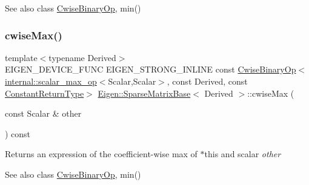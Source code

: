 \begin{DoxySeeAlso}{See also}
class \mbox{\hyperlink{class_eigen_1_1_cwise_binary_op}{Cwise\+Binary\+Op}}, min() 
\end{DoxySeeAlso}
\mbox{\label{class_eigen_1_1_sparse_matrix_base_aa9a80f82024c49bf896a8e9422d96a3b}} 
\subsubsection{\texorpdfstring{cwiseMax()}{cwiseMax()}\hspace{0.1cm}{\footnotesize\ttfamily [2/2]}}
{\footnotesize\ttfamily template$<$typename Derived$>$ \\
E\+I\+G\+E\+N\+\_\+\+D\+E\+V\+I\+C\+E\+\_\+\+F\+U\+NC E\+I\+G\+E\+N\+\_\+\+S\+T\+R\+O\+N\+G\+\_\+\+I\+N\+L\+I\+NE const \mbox{\hyperlink{class_eigen_1_1_cwise_binary_op}{Cwise\+Binary\+Op}}$<$\mbox{\hyperlink{struct_eigen_1_1internal_1_1scalar__max__op}{internal\+::scalar\+\_\+max\+\_\+op}}$<$Scalar,Scalar$>$, const Derived, const \mbox{\hyperlink{class_eigen_1_1_cwise_nullary_op}{Constant\+Return\+Type}}$>$ \mbox{\hyperlink{class_eigen_1_1_sparse_matrix_base}{Eigen\+::\+Sparse\+Matrix\+Base}}$<$ Derived $>$\+::cwise\+Max (\begin{DoxyParamCaption}\item[{const Scalar \&}]{other }\end{DoxyParamCaption}) const\hspace{0.3cm}{\ttfamily [inline]}}

\begin{DoxyReturn}{Returns}
an expression of the coefficient-\/wise max of $\ast$this and scalar {\itshape other} 
\end{DoxyReturn}
\begin{DoxySeeAlso}{See also}
class \mbox{\hyperlink{class_eigen_1_1_cwise_binary_op}{Cwise\+Binary\+Op}}, min() 
\end{DoxySeeAlso}
\mbox{\label{class_eigen_1_1_sparse_matrix_base_a4ca1d836da5da6d94c730f22efac78ef}} 
